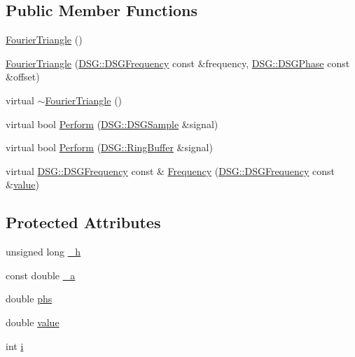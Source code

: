 \subsection*{Public Member Functions}
\begin{DoxyCompactItemize}
\item 
\hyperlink{class_d_s_g_1_1_fourier_1_1_fourier_triangle_a4129c053eddd87256ae39552a06ce329}{Fourier\+Triangle} ()
\item 
\hyperlink{class_d_s_g_1_1_fourier_1_1_fourier_triangle_abf887c6f5aada92780224511988cb688}{Fourier\+Triangle} (\hyperlink{namespace_d_s_g_a4315a061386fa1014fda09b15d3a6973}{D\+S\+G\+::\+D\+S\+G\+Frequency} const \&frequency, \hyperlink{namespace_d_s_g_a44431ce1eb0a7300efdd207bc879e52c}{D\+S\+G\+::\+D\+S\+G\+Phase} const \&offset)
\item 
virtual \hyperlink{class_d_s_g_1_1_fourier_1_1_fourier_triangle_a780bfb898d144200ff2bfb48849b4d24}{$\sim$\+Fourier\+Triangle} ()
\item 
virtual bool \hyperlink{class_d_s_g_1_1_fourier_1_1_fourier_triangle_ab5b947c1fc1f34a461c863b18e3e877d}{Perform} (\hyperlink{namespace_d_s_g_ac39a94cd27ebcd9c1e7502d0c624894a}{D\+S\+G\+::\+D\+S\+G\+Sample} \&signal)
\item 
virtual bool \hyperlink{class_d_s_g_1_1_fourier_1_1_fourier_triangle_a27b082e69cc7d70223dd3fbc552ba5bc}{Perform} (\hyperlink{class_d_s_g_1_1_ring_buffer}{D\+S\+G\+::\+Ring\+Buffer} \&signal)
\item 
virtual \hyperlink{namespace_d_s_g_a4315a061386fa1014fda09b15d3a6973}{D\+S\+G\+::\+D\+S\+G\+Frequency} const \& \hyperlink{class_d_s_g_1_1_fourier_1_1_fourier_triangle_a278a51ed8af32ea371adc903b9b25039}{Frequency} (\hyperlink{namespace_d_s_g_a4315a061386fa1014fda09b15d3a6973}{D\+S\+G\+::\+D\+S\+G\+Frequency} const \&\hyperlink{class_d_s_g_1_1_fourier_1_1_fourier_triangle_a11216186ce96fc78c7720cad3e01d025}{value})
\end{DoxyCompactItemize}
\subsection*{Protected Attributes}
\begin{DoxyCompactItemize}
\item 
unsigned long \hyperlink{class_d_s_g_1_1_fourier_1_1_fourier_triangle_a6fe21fae0d58d6221602e4bd74c30a80}{\+\_\+h}
\item 
const double \hyperlink{class_d_s_g_1_1_fourier_1_1_fourier_triangle_a64263fc3fa98179d57d34a3f105d8c97}{\+\_\+a}
\item 
double \hyperlink{class_d_s_g_1_1_fourier_1_1_fourier_triangle_a274fb09e2f14f88ec969dcaa7ad423f4}{phs}
\item 
double \hyperlink{class_d_s_g_1_1_fourier_1_1_fourier_triangle_a11216186ce96fc78c7720cad3e01d025}{value}
\item 
int \hyperlink{class_d_s_g_1_1_fourier_1_1_fourier_triangle_a041154af261bce33f4764f60b6606ea4}{i}
\end{DoxyCompactItemize}
